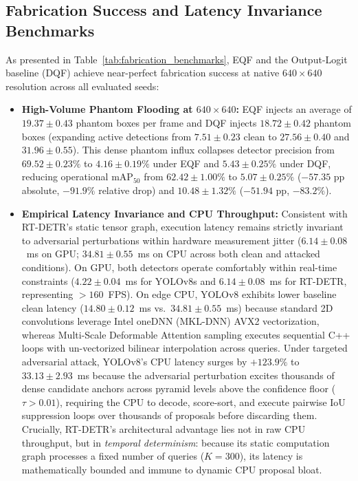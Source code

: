 \documentclass[preprint,12pt]{elsarticle}
\begin{document}
\subsection{Fabrication Success and Latency Invariance Benchmarks}
As presented in Table~\ref{tab:fabrication_benchmarks}, EQF and the Output-Logit baseline (DQF) achieve near-perfect fabrication success at native $640\times 640$ resolution across all evaluated seeds:
\begin{itemize}
    \item \textbf{High-Volume Phantom Flooding at $640\times 640$:} EQF injects an average of $19.37 \pm 0.43$ phantom boxes per frame and DQF injects $18.72 \pm 0.42$ phantom boxes (expanding active detections from $7.51 \pm 0.23$ clean to $27.56 \pm 0.40$ and $31.96 \pm 0.55$). This dense phantom influx collapses detector precision from $69.52 \pm 0.23\%$ to $4.16 \pm 0.19\%$ under EQF and $5.43 \pm 0.25\%$ under DQF, reducing operational $\mathrm{mAP}_{50}$ from $62.42 \pm 1.00\%$ to $5.07 \pm 0.25\%$ ($-57.35\text{ pp}$ absolute, $-91.9\%$ relative drop) and $10.48 \pm 1.32\%$ ($-51.94\text{ pp}$, $-83.2\%$).
    \item \textbf{Empirical Latency Invariance and CPU Throughput:} Consistent with RT-DETR's static tensor graph, execution latency remains strictly invariant to adversarial perturbations within hardware measurement jitter ($6.14 \pm 0.08$~ms on GPU; $34.81 \pm 0.55$~ms on CPU across both clean and attacked conditions). On GPU, both detectors operate comfortably within real-time constraints ($4.22 \pm 0.04$~ms for YOLOv8s and $6.14 \pm 0.08$~ms for RT-DETR, representing $>160$~FPS). On edge CPU, YOLOv8 exhibits lower baseline clean latency ($14.80 \pm 0.12$~ms vs.\ $34.81 \pm 0.55$~ms) because standard 2D convolutions leverage Intel oneDNN (MKL-DNN) AVX2 vectorization, whereas Multi-Scale Deformable Attention sampling executes sequential C++ loops with un-vectorized bilinear interpolation across queries. Under targeted adversarial attack, YOLOv8's CPU latency surges by $+123.9\%$ to $33.13 \pm 2.93$~ms because the adversarial perturbation excites thousands of dense candidate anchors across pyramid levels above the confidence floor ($\tau > 0.01$), requiring the CPU to decode, score-sort, and execute pairwise IoU suppression loops over thousands of proposals before discarding them. Crucially, RT-DETR's architectural advantage lies not in raw CPU throughput, but in \textit{temporal determinism}: because its static computation graph processes a fixed number of queries ($K=300$), its latency is mathematically bounded and immune to dynamic CPU proposal bloat.

\end{itemize}
\end{document}
